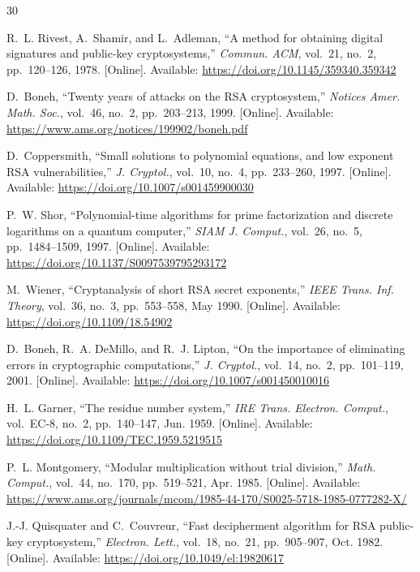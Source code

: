 \documentclass[journal]{IEEEtran}
\begin{document}

\begin{thebibliography}{30}

R.~L. Rivest, A.~Shamir, and L.~Adleman, ``A method for obtaining digital signatures and public-key cryptosystems,'' \textit{Commun. ACM}, vol.~21, no.~2, pp.~120--126, 1978. [Online]. Available: \url{https://doi.org/10.1145/359340.359342}

D.~Boneh, ``Twenty years of attacks on the RSA cryptosystem,'' \textit{Notices Amer. Math. Soc.}, vol.~46, no.~2, pp.~203--213, 1999. [Online]. Available: \url{https://www.ams.org/notices/199902/boneh.pdf}

D.~Coppersmith, ``Small solutions to polynomial equations, and low exponent RSA vulnerabilities,'' \textit{J. Cryptol.}, vol.~10, no.~4, pp.~233--260, 1997. [Online]. Available: \url{https://doi.org/10.1007/s001459900030}

P.~W. Shor, ``Polynomial-time algorithms for prime factorization and discrete logarithms on a quantum computer,'' \textit{SIAM J. Comput.}, vol.~26, no.~5, pp.~1484--1509, 1997. [Online]. Available: \url{https://doi.org/10.1137/S0097539795293172}

M.~Wiener, ``Cryptanalysis of short RSA secret exponents,'' \textit{IEEE Trans. Inf. Theory}, vol.~36, no.~3, pp.~553--558, May 1990. [Online]. Available: \url{https://doi.org/10.1109/18.54902}

D.~Boneh, R.~A. DeMillo, and R.~J. Lipton, ``On the importance of eliminating errors in cryptographic computations,'' \textit{J. Cryptol.}, vol.~14, no.~2, pp.~101--119, 2001. [Online]. Available: \url{https://doi.org/10.1007/s001450010016}

H.~L. Garner, ``The residue number system,'' \textit{IRE Trans. Electron. Comput.}, vol.~EC-8, no.~2, pp.~140--147, Jun. 1959. [Online]. Available: \url{https://doi.org/10.1109/TEC.1959.5219515}

P.~L. Montgomery, ``Modular multiplication without trial division,'' \textit{Math. Comput.}, vol.~44, no.~170, pp.~519--521, Apr. 1985. [Online]. Available: \url{https://www.ams.org/journals/mcom/1985-44-170/S0025-5718-1985-0777282-X/}

J.-J. Quisquater and C.~Couvreur, ``Fast decipherment algorithm for RSA public-key cryptosystem,'' \textit{Electron. Lett.}, vol.~18, no.~21, pp.~905--907, Oct. 1982. [Online]. Available: \url{https://doi.org/10.1049/el:19820617}


\end{thebibliography}
\end{document}
